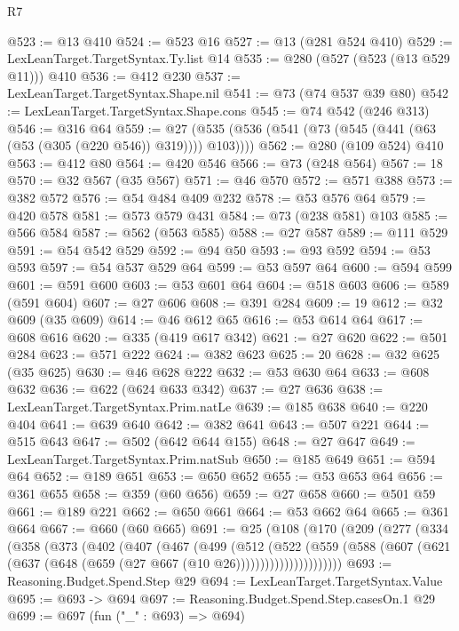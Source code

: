 \begin{lexlean}{R7}
\begin{coremodule}
@523 := @13 @410
@524 := @523 @16
@527 := @13 (@281 @524 @410)
@529 := LexLeanTarget.TargetSyntax.Ty.list @14
@535 := @280 (@527 (@523 (@13 @529 @11))) @410
@536 := @412 @230
@537 := LexLeanTarget.TargetSyntax.Shape.nil
@541 := @73 (@74 @537 @39 @80)
@542 := LexLeanTarget.TargetSyntax.Shape.cons
@545 := @74 @542 (@246 @313)
@546 := @316 @64
@559 := @27 (@535 (@536 (@541 (@73 (@545 (@441 (@63 (@53 (@305 (@220 @546)) @319)))) @103))))
@562 := @280 (@109 @524) @410
@563 := @412 @80
@564 := @420 @546
@566 := @73 (@248 @564)
@567 := 18
@570 := @32 @567 (@35 @567)
@571 := @46 @570
@572 := @571 @388
@573 := @382 @572
@576 := @54 @484 @409 @232
@578 := @53 @576 @64
@579 := @420 @578
@581 := @573 @579 @431
@584 := @73 (@238 @581) @103
@585 := @566 @584
@587 := @562 (@563 @585)
@588 := @27 @587
@589 := @111 @529
@591 := @54 @542 @529
@592 := @94 @50
@593 := @93 @592
@594 := @53 @593
@597 := @54 @537 @529 @64
@599 := @53 @597 @64
@600 := @594 @599
@601 := @591 @600
@603 := @53 @601 @64
@604 := @518 @603
@606 := @589 (@591 @604)
@607 := @27 @606
@608 := @391 @284
@609 := 19
@612 := @32 @609 (@35 @609)
@614 := @46 @612 @65
@616 := @53 @614 @64
@617 := @608 @616
@620 := @335 (@419 @617 @342)
@621 := @27 @620
@622 := @501 @284
@623 := @571 @222
@624 := @382 @623
@625 := 20
@628 := @32 @625 (@35 @625)
@630 := @46 @628 @222
@632 := @53 @630 @64
@633 := @608 @632
@636 := @622 (@624 @633 @342)
@637 := @27 @636
@638 := LexLeanTarget.TargetSyntax.Prim.natLe
@639 := @185 @638
@640 := @220 @404
@641 := @639 @640
@642 := @382 @641
@643 := @507 @221
@644 := @515 @643
@647 := @502 (@642 @644 @155)
@648 := @27 @647
@649 := LexLeanTarget.TargetSyntax.Prim.natSub
@650 := @185 @649
@651 := @594 @64
@652 := @189 @651
@653 := @650 @652
@655 := @53 @653 @64
@656 := @361 @655
@658 := @359 (@60 @656)
@659 := @27 @658
@660 := @501 @59
@661 := @189 @221
@662 := @650 @661
@664 := @53 @662 @64
@665 := @361 @664
@667 := @660 (@60 @665)
@691 := @25
    (@108
      (@170
        (@209
          (@277
            (@334
              (@358
                (@373
                  (@402
                    (@407
                      (@467
                        (@499
                          (@512
                            (@522
                              (@559
                                (@588
                                  (@607
                                    (@621 (@637 (@648 (@659 (@27 @667 (@10 @26))))))))))))))))))))))
@693 := Reasoning.Budget.Spend.Step @29
@694 := LexLeanTarget.TargetSyntax.Value
@695 := @693 -> @694
@697 := Reasoning.Budget.Spend.Step.casesOn.{1} @29
@699 := @697 (fun ("_" : @693) => @694)

\end{coremodule}
\end{lexlean}
